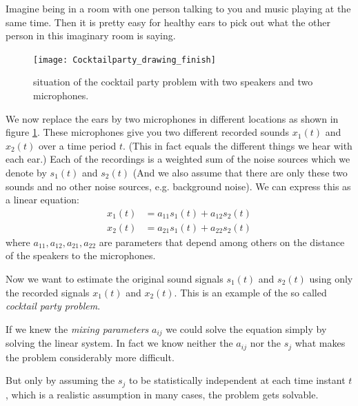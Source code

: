 \documentclass[12pt, a4paper]{article}
\numberwithin{equation}{section}
\numberwithin{figure}{section}
\numberwithin{table}{section}
\begin{document}
	Imagine being in a room with one person talking to you and music playing at the same time.
	Then it is pretty easy for healthy ears to pick out what the other person in this imaginary room is saying.
	
	\begin{figure}[h!]
		\begin{center}
			\texttt{[image: Cocktailparty\_drawing\_finish]}
		\end{center}
		\caption{situation of the cocktail party problem with two speakers and two microphones.}
		\label{cocktailparty-drawing}
	\end{figure}
	We now replace the ears by two microphones in different locations as shown in figure \ref{cocktailparty-drawing}. These microphones give you two different recorded sounds $x_1(t)$ and $x_2(t)$ over a time period $t$.
	(This in fact equals the different things we hear with each ear.)
	Each of the recordings is a weighted sum of the noise sources which we denote by $s_1(t)$ and $s_2(t)$ (And we also assume that there are only these two sounds and no other noise sources, e.g. background noise). We can express this as a linear equation:
	\begin{equation}
	\begin{split}
	x_1(t)&=a_{11}s_1(t)+a_{12}s_2(t)\\
	x_2(t)&=a_{21}s_1(t)+a_{22}s_2(t)
	\end{split}
	\end{equation}
	where $a_{11}, a_{12}, a_{21}, a_{22}$ are parameters that depend among others on the distance of the speakers to the microphones.
	
	Now we want to estimate the  original sound signals $s_1(t)$ and $s_2(t)$ using only the recorded signals $x_1(t)$ and $x_2(t)$.
	This is an example of the so called \textit{cocktail party problem}.
	
	
	If we knew the \textit{mixing parameters} $a_{ij}$ we could solve the equation simply by solving the linear system. In fact we know neither the $a_{ij}$ nor the $s_j$ what makes the problem considerably more difficult.
	
	But only by assuming the $s_j$ to be statistically independent at each time instant $t$, which is a realistic assumption in many cases, the problem gets solvable. %
	
\end{document}
